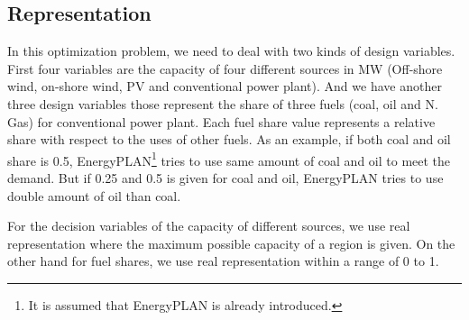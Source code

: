 \documentclass{article}
\begin{document}
\subsection{Representation}

In  this optimization problem, we need to deal with two kinds of design variables. 
First four variables are the capacity of four different sources in MW (Off-shore wind, on-shore wind, PV and conventional power plant). 
And we have another three design variables those represent the share of three fuels (coal, oil and N. Gas) for conventional power plant.
Each fuel share value represents a relative share with respect to the uses of other fuels. 
As an example, if both coal and oil share is 0.5, EnergyPLAN\footnote{It is assumed that EnergyPLAN is already introduced.} tries to use same amount of coal and oil to meet the demand. 
But if 0.25 and 0.5 is given for coal and oil, EnergyPLAN tries to use double amount of oil than coal.

For the decision variables of the capacity of different  sources, we use real representation where the maximum possible capacity of a region is given. 
On the other hand for fuel shares, we use real representation within a range of 0 to 1. 
\end{document}
